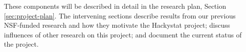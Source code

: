 These components will be described in detail in the research plan, Section
\ref{sec:project-plan}.  The intervening sections describe results from our
previous NSF-funded research and how they motivate the Hackystat project;
discuss influences of other research on this project; and document the
current status of the project.




